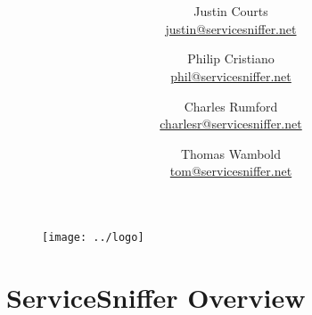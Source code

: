\documentclass[titlepage,11pt]{article}
\title{\textbf{\mytitle}}
\author{
    Justin Courts \\\url{justin@servicesniffer.net}
    \and Philip Cristiano \\\url{phil@servicesniffer.net}
    \and Charles Rumford \\\url{charlesr@servicesniffer.net}
    \and Thomas Wambold \\\url{tom@servicesniffer.net}
}
\date{\mydate}
\begin{document}
\begin{figure}
    \vspace{-6em}
    \centering
    \texttt{[image: ../logo]}
    \vspace{-4em}
\end{figure}

\maketitle



\section*{ServiceSniffer Overview}

\end{document}
